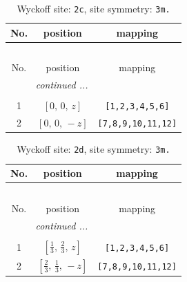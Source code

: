 \documentclass[fleqn,8pt]{jsarticle}
\begin{document}
\begin{longtable}{ccc}
\caption{Wyckoff site: {\tt 2c}, site symmetry: {\tt 3m.}}
 \\
 \hline \hline
No. & position & mapping \\ \hline \endfirsthead

\multicolumn{2}{l}{\tablename\ \thetable{}} \\
 \hline \hline
No. & position & mapping \\ \hline \endhead

 \hline \hline
\multicolumn{2}{r}{\footnotesize\it continued ...} \\ \endfoot

 \hline \hline
\multicolumn{2}{r}{} \\ \endlastfoot

1 & $\left[ 0,\, 0,\, z \right]$ & {\tt [1,2,3,4,5,6]} \\ \hline
2 & $\left[ 0,\, 0,\, - z \right]$ & {\tt [7,8,9,10,11,12]} \\
\end{longtable}
\renewcommand{\arraystretch}{1.2}
\begin{longtable}{ccc}
\caption{Wyckoff site: {\tt 2d}, site symmetry: {\tt 3m.}}
 \\
 \hline \hline
No. & position & mapping \\ \hline \endfirsthead

\multicolumn{2}{l}{\tablename\ \thetable{}} \\
 \hline \hline
No. & position & mapping \\ \hline \endhead

 \hline \hline
\multicolumn{2}{r}{\footnotesize\it continued ...} \\ \endfoot

 \hline \hline
\multicolumn{2}{r}{} \\ \endlastfoot

1 & $\left[ \frac{1}{3},\, \frac{2}{3},\, z \right]$ & {\tt [1,2,3,4,5,6]} \\ \hline
2 & $\left[ \frac{2}{3},\, \frac{1}{3},\, - z \right]$ & {\tt [7,8,9,10,11,12]} \\
\end{longtable}
\renewcommand{\arraystretch}{1.2}
\end{document}
